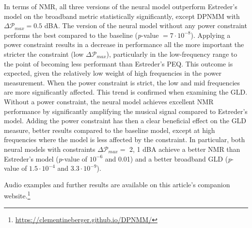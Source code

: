 In terms of NMR, all three versions of the neural model outperform Estreder's model on the broadband metric statistically significantly, except DPNMM with $\Delta \mathcal{P}_{max} = 0.5$ dBA. The version of the neural model without any power constraint performs the best compared to the baseline (\textit{p}-value $= 7\cdot 10^{-8}$). Applying a power constraint results in a decrease in performance all the more important the stricter the constraint (low $\Delta \mathcal{P}_{max}$), particularly in the low-frequency range to the point of becoming less performant than Estreder's PEQ. This outcome is expected, given the relatively low weight of high frequencies in the power measurement. When the power constraint is strict, the low and mid frequencies are more significantly affected. This trend is confirmed when examining the GLD. Without a power constraint, the neural model achieves excellent NMR performance by significantly amplifying the musical signal compared to Estreder's model. Adding the power constraint has then a clear beneficial effect on the GLD measure,  better results compared to the baseline model, except at high frequencies where the model is less affected by the constraint. In particular, both neural models with constraints $\Delta \mathcal{P}_{max} =$ 2, 1 dBA achieve a better NMR than Estreder's model (\textit{p}-value of $10^{-6}$ and 0.01) and a better broadband GLD (\textit{p}-value of $1.5 \cdot 10^{-4}$ and $3.3 \cdot 10^{-9}$).

Audio examples and further results are available on this article's companion website.\footnote{\href{https://clementineberger.github.io/DPNMM/}{https://clementineberger.github.io/DPNMM/}}